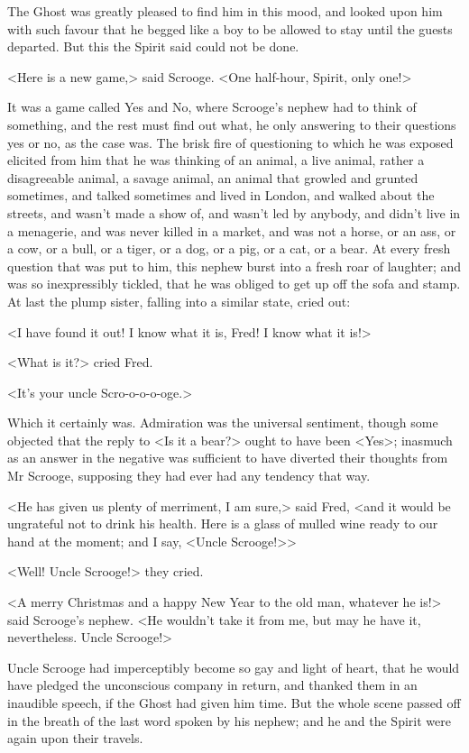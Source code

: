 The Ghost was greatly pleased to find him in this mood, and looked upon him with
such favour that he begged like a boy to be allowed to stay until the guests
departed. But this the Spirit said could not be done.

<Here is a new game,> said Scrooge. <One half-hour, Spirit, only one!>

It was a game called Yes and No, where Scrooge's nephew had to think of
something, and the rest must find out what, he only answering to their questions
yes or no, as the case was. The brisk fire of questioning to which he was
exposed elicited from him that he was thinking of an animal, a live animal,
rather a disagreeable animal, a savage animal, an animal that growled and
grunted sometimes, and talked sometimes and lived in London, and walked about
the streets, and wasn't made a show of, and wasn't led by anybody, and didn't
live in a menagerie, and was never killed in a market, and was not a horse, or
an ass, or a cow, or a bull, or a tiger, or a dog, or a pig, or a cat, or a
bear. At every fresh question that was put to him, this nephew burst into a
fresh roar of laughter; and was so inexpressibly tickled, that he was obliged to
get up off the sofa and stamp. At last the plump sister, falling into a similar
state, cried out:

<I have found it out! I know what it is, Fred! I know what it is!>

<What is it?> cried Fred.

<It's your uncle Scro-o-o-o-oge.>

Which it certainly was. Admiration was the universal sentiment, though some
objected that the reply to <Is it a bear?> ought to have been <Yes>; inasmuch as
an answer in the negative was sufficient to have diverted their thoughts from Mr
Scrooge, supposing they had ever had any tendency that way.

<He has given us plenty of merriment, I am sure,> said Fred, <and it would be
ungrateful not to drink his health. Here is a glass of mulled wine ready to our
hand at the moment; and I say, <Uncle Scrooge!>>

<Well! Uncle Scrooge!> they cried.

<A merry Christmas and a happy New Year to the old man, whatever he is!> said
Scrooge's nephew. <He wouldn't take it from me, but may he have it,
nevertheless. Uncle Scrooge!>

Uncle Scrooge had imperceptibly become so gay and light of heart, that he would
have pledged the unconscious company in return, and thanked them in an inaudible
speech, if the Ghost had given him time. But the whole scene passed off in the
breath of the last word spoken by his nephew; and he and the Spirit were again
upon their travels.

